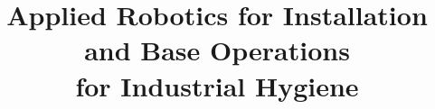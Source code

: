\title{\LARGE \bf
Applied Robotics for Installation and Base Operations \\for Industrial Hygiene}



